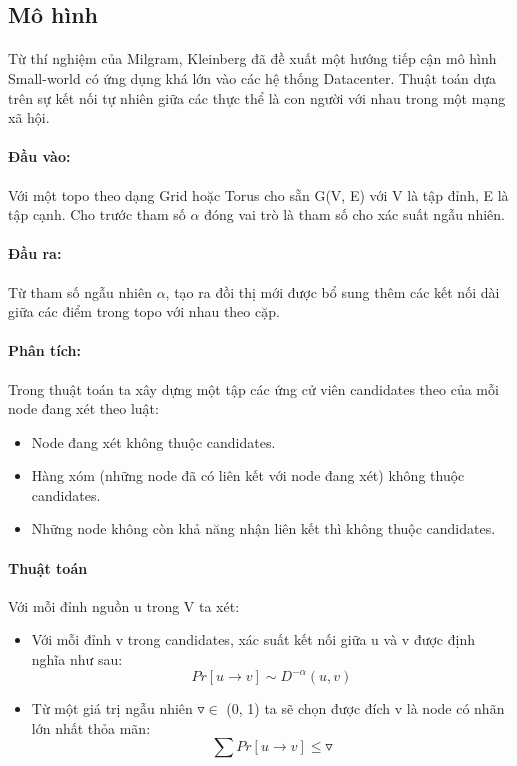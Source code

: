 \documentclass[../report.tex]{subfiles}
\begin{document}
\subsection{Mô hình}
\paragraph*{}
Từ thí nghiệm của Milgram, Kleinberg đã đề xuất một hướng tiếp cận mô hình Small-world có ứng dụng khá lớn vào các hệ thống Datacenter. Thuật toán dựa trên sự kết nối tự nhiên giữa các thực thể là con người với nhau trong một mạng xã hội.
\paragraph*{Đầu vào:} Với một topo theo dạng Grid hoặc Torus cho sẵn G(V, E) với V là tập đỉnh, E là tập cạnh. Cho trước tham số $\alpha$ đóng vai trò là tham số cho xác suất ngẫu nhiên.
\paragraph*{Đầu ra:} Từ tham số ngẫu nhiên $\alpha$, tạo ra đồi thị mới được bổ sung thêm các kết nối dài giữa các điểm trong topo với nhau theo cặp. 
\paragraph*{Phân tích:} Trong thuật toán ta xây dựng một tập các ứng cử viên candidates theo của mỗi node đang xét theo luật:
\begin{itemize}
    \item Node đang xét không thuộc candidates.
    \item Hàng xóm (những node đã có liên kết với node đang xét) không thuộc candidates.
    \item Những node không còn khả năng nhận liên kết thì không thuộc candidates.
\end{itemize}

\paragraph*{Thuật toán}
Với mỗi đỉnh nguồn u trong V ta xét:
\begin{itemize}
    \item Với mỗi đỉnh v trong candidates, xác suất kết nối giữa u và v được định nghĩa như sau: \\
        \begin{equation}
            Pr[u \rightarrow v] \sim D^{-\alpha}(u, v)
        \end{equation}
    \item Từ một giá trị ngẫu nhiên $\triangledown \in$ (0, 1) ta sẽ chọn được đích v là node có nhãn lớn nhất thỏa mãn: 
        \begin{equation}
            \sum Pr[u \rightarrow v] \le \triangledown
        \end{equation}
\end{itemize}
\end{document}
